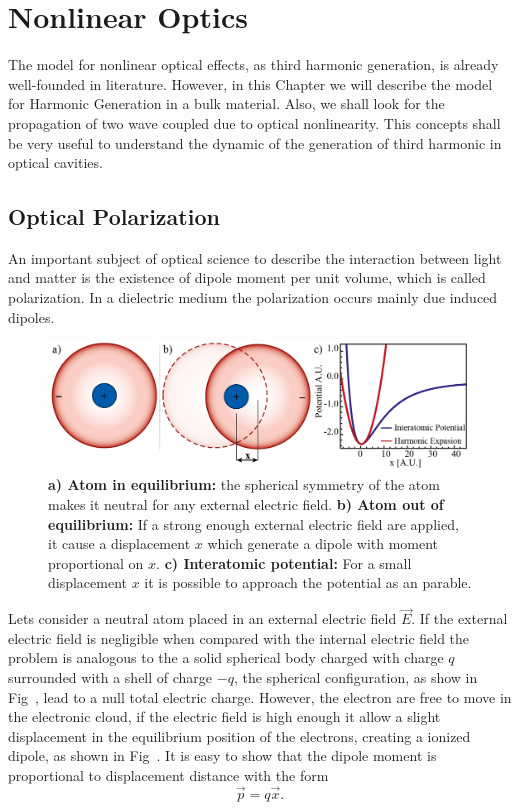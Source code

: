 \chapter{Nonlinear Optics}
The model for nonlinear optical effects, as third harmonic generation, is already well-founded in literature. However, in this Chapter we will describe the model for Harmonic Generation in a bulk material. Also, we shall look for the propagation of two wave coupled due to optical nonlinearity. This concepts shall be very useful to understand the dynamic of the generation of third harmonic in optical cavities.  

\section{Optical Polarization}
\label{sec:Optical_nonlinear}
An important subject of optical science to describe the interaction between light and matter is the existence of dipole moment per unit volume, which is called polarization. In a dielectric medium the polarization occurs mainly due induced dipoles.

\begin{figure}[h!]
    \centering
    \includegraphics[width = 16cm]{figuras/Dissertation_atomic_polarization.jpg}
    \caption{\textbf{a) Atom in equilibrium:} the spherical symmetry of the atom makes it neutral for any external electric field. \textbf{b) Atom out of equilibrium:} If a strong enough external electric field are applied, it cause a displacement $x$ which generate a dipole with moment proportional on $x$. \textbf{c) Interatomic potential:} For a small displacement $x$ it is possible to approach the potential as an parable.}
    \label{fig:polarization}
\end{figure}
Lets consider a neutral atom placed in an external electric field $\vec{E}$. If the external electric field is negligible when compared with the internal electric field the problem is analogous to the a solid spherical body charged with charge $q$ surrounded with a shell of charge $-q$, the spherical configuration, as show in Fig~, lead to a null total electric charge\needcit. However, the electron are free to move in the electronic cloud, if the electric field is high enough it allow a slight displacement in the equilibrium position of the electrons, creating a ionized dipole, as shown in Fig~. It is easy to show that the dipole moment is proportional to displacement distance with the form
\begin{equation}
    \vec{p} = q\vec{x}.
\end{equation}

